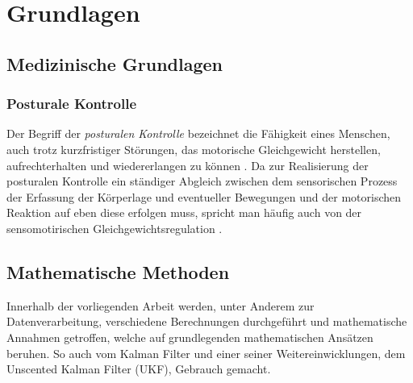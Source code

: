 
\chapter{Grundlagen}
\section{Medizinische Grundlagen}
\subsection{Posturale Kontrolle}
Der Begriff der \textit{posturalen Kontrolle} bezeichnet die Fähigkeit eines Menschen, auch trotz kurzfristiger Störungen, das motorische Gleichgewicht herstellen, aufrechterhalten und wiedererlangen zu können \cite{PK1}.
Da zur Realisierung der posturalen Kontrolle ein ständiger Abgleich zwischen dem sensorischen Prozess der Erfassung der Körperlage und eventueller Bewegungen und der motorischen Reaktion auf eben diese erfolgen muss, spricht man häufig auch von der sensomotirischen Gleichgewichtsregulation \cite{PK2}.

\section{Mathematische Methoden}
Innerhalb der vorliegenden Arbeit werden, unter Anderem zur Datenverarbeitung, verschiedene Berechnungen durchgeführt und mathematische Annahmen getroffen, welche auf grundlegenden mathematischen Ansätzen beruhen.
So auch vom Kalman Filter und einer seiner Weitereinwicklungen, dem Unscented Kalman Filter (UKF), Gebrauch gemacht.


